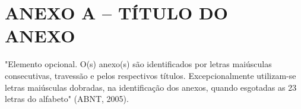 \chapter{ANEXO A – TÍTULO DO ANEXO}
\label{lab:anexoA}

"Elemento opcional. O(s) anexo(s) são identificados por letras maiúsculas consecutivas, travessão e pelos respectivos títulos. Excepcionalmente utilizam-se letras maiúsculas dobradas, na identificação dos anexos, quando esgotadas as 23 letras do alfabeto" (ABNT, 2005).

